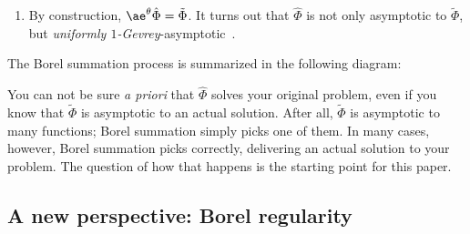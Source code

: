 \documentclass{article}
\newcommand{\series}[1]{\tilde{#1}}
\newcommand{\laplace}{\mathcal{L}}
\newcommand{\borel}{\mathcal{B}}
\newcommand{\aexp}{\mathrm{\ae}}
\theoremstyle{definition}
\theoremstyle{plain}
\begin{document}
\begin{enumerate}[start=4]
\item By construction, $\aexp^\theta \hat{\Phi} = \series{\Phi}$. It turns out that $\hat{\Phi}$ is not only asymptotic to $\series{\Phi}$, but {\em {uniformly} $1$-Gevrey}-asymptotic~\cite[Corollary~5.23]{diverg-resurg-i}.
\end{enumerate}

The Borel summation process is summarized in the following diagram:
\begin{center}
\end{center}

You can not be sure {\em a priori} that $\hat{\Phi}$ solves your original problem, even if you know that $\series{\Phi}$ is asymptotic to an actual solution. After all, $\series{\Phi}$ is asymptotic to many functions; Borel summation simply picks one of them. In many cases, however, Borel summation picks correctly, delivering an actual solution to your problem. The question of how that happens is the starting point for this paper.
%
\subsection{A new perspective: Borel regularity}
%
\end{document}
